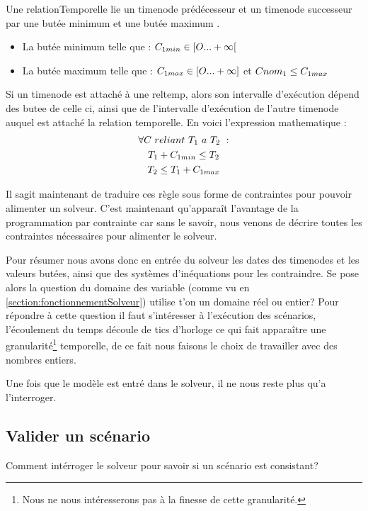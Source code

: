 Une \gls{relationTemporelle}  lie un \gls{timenode}  prédécesseur et un \gls{timenode}  successeur par une butée minimum  et une butée maximum .
\begin{itemize}
    \item La butée minimum  telle que : $ C_{1min} \in \left [ O ... +\infty \right [ $
    \item La butée maximum  telle que : $C_{1max} \in \left [ O ... +\infty \right ]$ et $ Cnom_{1} \leq C_{1max} $
\end{itemize}

Si un \gls{timenode} est attaché à une \gls{reltemp}, alors son intervalle d'exécution dépend des butee de celle ci, ainsi que de l'intervalle d'exécution de l'autre \gls{timenode} auquel est attaché la relation temporelle. En voici l'expression mathematique : 
\begin{gather*}
    \forall C_{}~reliant~T_{1}~a~T_{2}~:\\
    T_{1} + C_{1min} \leq T_{2}\\
    T_{2} \leq T_{1} + C_{1max}
\end{gather*}

Il sagit maintenant de traduire ces règle sous forme de contraintes pour pouvoir alimenter un solveur.
%
C'est maintenant qu'apparaît l'avantage de la programmation par contrainte car sans le savoir, nous venons de décrire toutes les contraintes nécessaires pour alimenter le solveur.

Pour résumer nous avons donc en entrée du solveur les dates des timenodes et les valeurs butées, ainsi que des systèmes d'inéquations pour les contraindre. Se pose alors la question du domaine des variable (comme vu en \autoref{section:fonctionnementSolveur}) utilise t'on un domaine réel ou entier?
%
Pour répondre à cette question il faut s'intéresser à l'exécution des scénarios, l'écoulement du temps découle de tics d'horloge ce qui fait apparaître une granularité\footnote{Nous ne nous intéresserons pas à la finesse de cette granularité.} temporelle, de ce fait nous faisons le choix de travailler avec des nombres entiers. 

Une fois que le modèle est entré dans le solveur, il ne nous reste plus qu'a l'interroger.

\subsection{Valider un scénario}
Comment intérroger le solveur pour savoir si un scénario est consistant?

